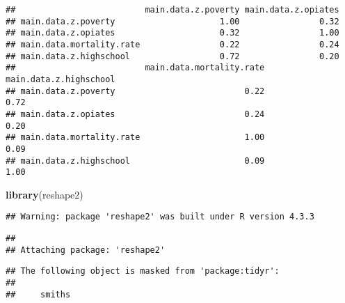 \documentclass[
]{article}
\newenvironment{Shaded}{\begin{snugshade}}{\end{snugshade}}
\newcommand{\FunctionTok}[1]{\textcolor[rgb]{0.13,0.29,0.53}{\textbf{#1}}}
\newcommand{\NormalTok}[1]{#1}
\begin{document}
\begin{verbatim}
##                          main.data.z.poverty main.data.z.opiates
## main.data.z.poverty                     1.00                0.32
## main.data.z.opiates                     0.32                1.00
## main.data.mortality.rate                0.22                0.24
## main.data.z.highschool                  0.72                0.20
##                          main.data.mortality.rate main.data.z.highschool
## main.data.z.poverty                          0.22                   0.72
## main.data.z.opiates                          0.24                   0.20
## main.data.mortality.rate                     1.00                   0.09
## main.data.z.highschool                       0.09                   1.00
\end{verbatim}

\begin{Shaded}
\begin{Highlighting}[]
\FunctionTok{library}\NormalTok{(reshape2)}
\end{Highlighting}
\end{Shaded}

\begin{verbatim}
## Warning: package 'reshape2' was built under R version 4.3.3
\end{verbatim}

\begin{verbatim}
## 
## Attaching package: 'reshape2'
\end{verbatim}

\begin{verbatim}
## The following object is masked from 'package:tidyr':
## 
##     smiths
\end{verbatim}
\end{document}
